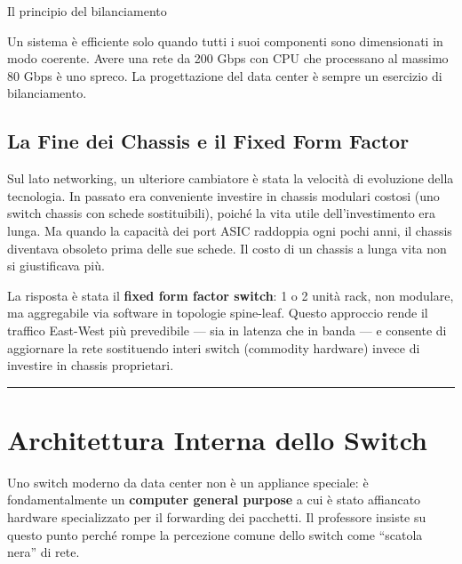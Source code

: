 \documentclass[
  italian,
  openany]{book}
\begin{document}
\begin{callouttip}{Il principio del bilanciamento}

Un sistema è efficiente solo quando tutti i suoi componenti sono
dimensionati in modo coerente. Avere una rete da 200 Gbps con CPU che
processano al massimo 80 Gbps è uno spreco. La progettazione del data
center è sempre un esercizio di bilanciamento.

\end{callouttip}

\subsection{La Fine dei Chassis e il Fixed Form
Factor}\label{la-fine-dei-chassis-e-il-fixed-form-factor}

Sul lato networking, un ulteriore cambiatore è stata la velocità di
evoluzione della tecnologia. In passato era conveniente investire in
chassis modulari costosi (uno switch chassis con schede sostituibili),
poiché la vita utile dell'investimento era lunga. Ma quando la capacità
dei port ASIC raddoppia ogni pochi anni, il chassis diventava obsoleto
prima delle sue schede. Il costo di un chassis a lunga vita non si
giustificava più.

La risposta è stata il \textbf{fixed form factor switch}: 1 o 2 unità
rack, non modulare, ma aggregabile via software in topologie spine-leaf.
Questo approccio rende il traffico East-West più prevedibile --- sia in
latenza che in banda --- e consente di aggiornare la rete sostituendo
interi switch (commodity hardware) invece di investire in chassis
proprietari.

\begin{center}\rule{0.5\linewidth}{0.5pt}\end{center}

\section{Architettura Interna dello
Switch}\label{architettura-interna-dello-switch}

Uno switch moderno da data center non è un appliance speciale: è
fondamentalmente un \textbf{computer general purpose} a cui è stato
affiancato hardware specializzato per il forwarding dei pacchetti. Il
professore insiste su questo punto perché rompe la percezione comune
dello switch come ``scatola nera'' di rete.
\end{document}
